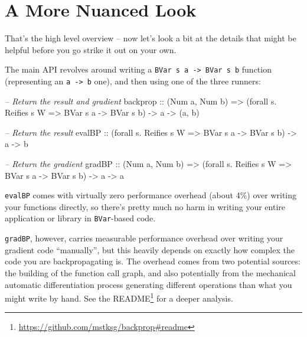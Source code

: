 \documentclass[]{article}
\newenvironment{Shaded}{}{}
\newcommand{\CommentTok}[1]{\textcolor[rgb]{0.38,0.63,0.69}{\textit{#1}}}
\newcommand{\DataTypeTok}[1]{\textcolor[rgb]{0.56,0.13,0.00}{#1}}
\newcommand{\FunctionTok}[1]{\textcolor[rgb]{0.02,0.16,0.49}{#1}}
\newcommand{\NormalTok}[1]{#1}
\newcommand{\OtherTok}[1]{\textcolor[rgb]{0.00,0.44,0.13}{#1}}
\renewcommand{\href}[2]{#2\footnote{\url{#1}}}
\begin{document}
\hypertarget{a-more-nuanced-look}{%
\section{A More Nuanced Look}\label{a-more-nuanced-look}}

That's the high level overview -- now let's look a bit at the details that might
be helpful before you go strike it out on your own.

The main API revolves around writing a
\texttt{BVar\ s\ a\ -\textgreater{}\ BVar\ s\ b} function (representing an
\texttt{a\ -\textgreater{}\ b} one), and then using one of the three runners:

\begin{Shaded}
\begin{Highlighting}[]
\CommentTok{-- Return the result and gradient}
\OtherTok{backprop ::}\NormalTok{ (}\DataTypeTok{Num}\NormalTok{ a, }\DataTypeTok{Num}\NormalTok{ b)}
         \OtherTok{=>}\NormalTok{ (forall s}\FunctionTok{.} \DataTypeTok{Reifies}\NormalTok{ s }\DataTypeTok{W} \OtherTok{=>} \DataTypeTok{BVar}\NormalTok{ s a }\OtherTok{->} \DataTypeTok{BVar}\NormalTok{ s b) }\OtherTok{->}\NormalTok{ a }\OtherTok{->}\NormalTok{ (a, b)}

\CommentTok{-- Return the result}
\OtherTok{evalBP   ::}\NormalTok{ (forall s}\FunctionTok{.} \DataTypeTok{Reifies}\NormalTok{ s }\DataTypeTok{W} \OtherTok{=>} \DataTypeTok{BVar}\NormalTok{ s a }\OtherTok{->} \DataTypeTok{BVar}\NormalTok{ s b) }\OtherTok{->}\NormalTok{ a }\OtherTok{->}\NormalTok{ b}

\CommentTok{-- Return the gradient}
\OtherTok{gradBP   ::}\NormalTok{ (}\DataTypeTok{Num}\NormalTok{ a, }\DataTypeTok{Num}\NormalTok{ b)}
         \OtherTok{=>}\NormalTok{ (forall s}\FunctionTok{.} \DataTypeTok{Reifies}\NormalTok{ s }\DataTypeTok{W} \OtherTok{=>} \DataTypeTok{BVar}\NormalTok{ s a }\OtherTok{->} \DataTypeTok{BVar}\NormalTok{ s b) }\OtherTok{->}\NormalTok{ a }\OtherTok{->}\NormalTok{ a}
\end{Highlighting}
\end{Shaded}

\texttt{evalBP} comes with virtually zero performance overhead (about 4\%) over
writing your functions directly, so there's pretty much no harm in writing your
entire application or library in \texttt{BVar}-based code.

\texttt{gradBP}, however, carries measurable performance overhead over writing
your gradient code ``manually'', but this heavily depends on exactly how complex
the code you are backpropagating is. The overhead comes from two potential
sources: the building of the function call graph, and also potentially from the
mechanical automatic differentiation process generating different operations
than what you might write by hand. See the
\href{https://github.com/mstksg/backprop\#readme}{README} for a deeper analysis.
\end{document}

